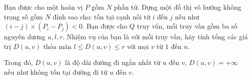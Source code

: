 Bạn được cho một hoán vị $P$ gồm $N$ phần tử. Dựng một đồ thị vô hướng không trọng số gồm $N$ đỉnh sao cho: tồn tại cạnh nối từ $i$ đến $j$ nếu như $(i-j)\times (P_i-P_j)<0$. Bạn được cho $Q$ truy vấn, mỗi truy vấn gồm ba số nguyên dương $u,l,r$. Nhiệm vụ của bạn là với mỗi truy vấn, hãy tính tổng các giá trị $D(u,v)$ thỏa mãn $l\le D(u,v)\le r$ với mọi $v$ từ $1$ đến $n$.

Trong đó, $D(u,v)$ là độ dài đường đi ngắn nhất từ $u$ đến $v$, $D(u,v)=+\infty$ nếu như không tồn tại đường đi từ $u$ đến $v$.